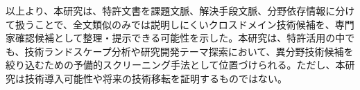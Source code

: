 以上より、本研究は、特許文書を課題文脈、解決手段文脈、分野依存情報に分けて扱うことで、全文類似のみでは説明しにくいクロスドメイン技術候補を、専門家確認候補として整理・提示できる可能性を示した。本研究は、特許活用の中でも、技術ランドスケープ分析や研究開発テーマ探索において、異分野技術候補を絞り込むための予備的スクリーニング手法として位置づけられる。ただし、本研究は技術導入可能性や将来の技術移転を証明するものではない。
